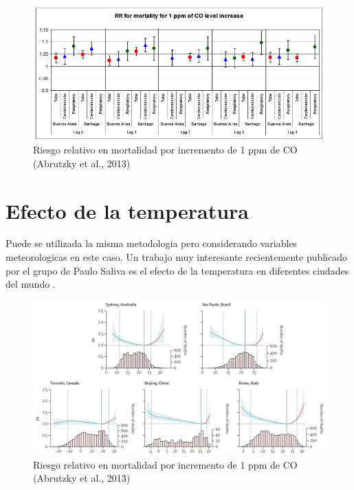 \documentclass[]{book}
\begin{document}
\begin{figure}
\includegraphics[width=11.44in,height=1.8\textheight]{figs/rosana1} \caption{Riesgo relativo en mortalidad por incremento de 1 ppm de CO (Abrutzky et al., 2013)}\label{fig:unnamed-chunk-63}
\end{figure}

\hypertarget{efecto-de-la-temperatura}{%
\section{Efecto de la temperatura}\label{efecto-de-la-temperatura}}

Puede se utilizada la misma metodologia pero considerando variables meteorologicas en este caso. Un trabajo muy interesante recientemente publicado por el grupo de Paulo Saliva es el efecto de la temperatura en diferentes ciudades del mundo \citep{GASPARRINI2015369}.

\begin{figure}
\includegraphics[width=18.97in,height=1.8\textheight]{figs/temp1} \caption{Riesgo relativo en mortalidad por incremento de 1 ppm de CO (Abrutzky et al., 2013)}\label{fig:unnamed-chunk-64}
\end{figure}


\end{document}
